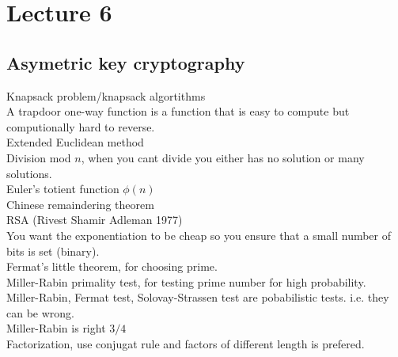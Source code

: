 \section{Lecture 6}

\subsection{Asymetric key cryptography}

Knapsack problem/knapsack algortithms \\

A trapdoor one-way function is a function that is easy to compute but
computionally hard to reverse.\\

Extended Euclidean method\\

Division mod $n$, when you cant divide you either has no solution or many
solutions.\\

Euler's totient function \(\phi(n)\)\\

Chinese remaindering theorem\\

RSA (Rivest Shamir Adleman 1977)\\

You want the exponentiation to be cheap so you ensure that a small number of
bits is set (binary).\\

Fermat's little theorem, for choosing prime.\\

Miller-Rabin primality test, for testing prime number for high probability.\\

Miller-Rabin, Fermat test, Solovay-Strassen test are pobabilistic tests. i.e.
they can be wrong. \\

Miller-Rabin is right \(3/4\)\\

Factorization, use conjugat rule and factors of different length is prefered.\\


